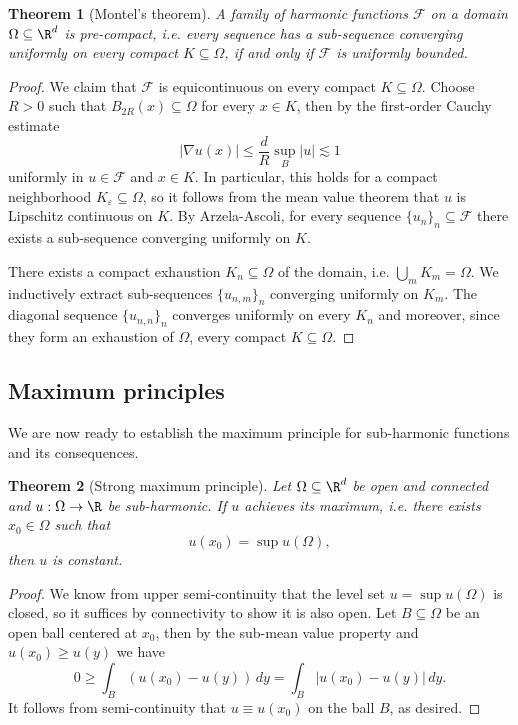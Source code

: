 \documentclass[reqno]{amsart}
\newtheorem{theorem}{Theorem}
\theoremstyle{definition}
\theoremstyle{remark}
\renewcommand{\epsilon}{\varepsilon}
\begin{document}
\begin{theorem}[Montel's theorem]
	A family of harmonic functions $\mathcal F$ on a domain $\Omega \subseteq \R^d$ is pre-compact, i.e. every sequence has a sub-sequence converging uniformly on every compact $K \subseteq \Omega$, if and only if $\mathcal F$ is uniformly bounded. 
\end{theorem}

\begin{proof}
	We claim that $\mathcal F$ is equicontinuous on every compact $K \subseteq \Omega$. Choose $R > 0$ such that $B_{2R} (x) \subseteq \Omega$ for every $x \in K$, then by the first-order Cauchy estimate
		\[ |\nabla u (x)| \leq \frac{d}{R} \sup_B |u| \lesssim 1 \]
	uniformly in $u \in \mathcal F$ and $x \in K$. In particular, this holds for a compact neighborhood $K_\epsilon \subseteq \Omega$, so it follows from the mean value theorem that $u$ is Lipschitz continuous on $K$. By Arzela-Ascoli, for every sequence $\{u_n\}_n \subseteq \mathcal F$ there exists a sub-sequence converging uniformly on $K$.
	
	There exists a compact exhaustion $K_n \subseteq \Omega$ of the domain, i.e. $\bigcup_m K_m = \Omega$. We inductively extract sub-sequences $\{ u_{n, m} \}_n$ converging uniformly on $K_m$. The diagonal sequence $\{ u_{n, n} \}_n$ converges uniformly on every $K_n$ and moreover, since they form an exhaustion of $\Omega$, every compact $K \subseteq \Omega$. 	
\end{proof}


\subsection{Maximum principles}

We are now ready to establish the maximum principle for sub-harmonic functions and its consequences. 

\begin{theorem}[Strong maximum principle]
	Let $\Omega \subseteq \R^d$ be open and connected and $u: \Omega \to \R$ be sub-harmonic. If $u$ achieves its maximum, i.e. there exists $x_0 \in \Omega$ such that
		\[ u(x_0) = \sup u(\Omega), \]
	then $u$ is constant. 
\end{theorem}

\begin{proof}
	We know from upper semi-continuity that the level set $u = \sup u (\Omega)$ is closed, so it suffices by connectivity to show it is also open. Let $B \subseteq \Omega$ be an open ball centered at $x_0$, then by the sub-mean value property and $u(x_0) \geq u(y)$ we have
		\[ 0 \geq \int_B (u(x_0) - u(y)) \, dy = \int_B |u (x_0) - u(y)| \, dy. \]
	It follows from semi-continuity that $u \equiv u(x_0)$ on the ball $B$, as desired. 
\end{proof}
\end{document}
